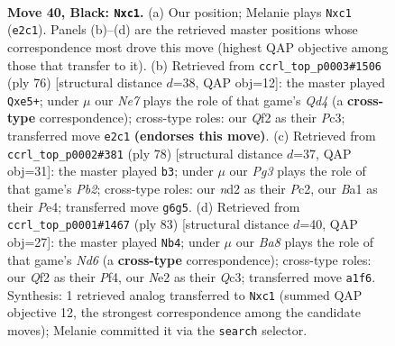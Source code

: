 \documentclass[11pt]{article}
\begin{document}
\clearpage

\begin{figure}[p]\centering
\begin{subfigure}{0.46\textwidth}\centering
\resizebox{\linewidth}{!}{%
\newchessgame
\chessboard[
  setfen={6k1/1p3p2/6p1/p7/7p/7P/P2NnqP1/b1Q4K b - - 0 40},
  showmover=false,
  pgfstyle=straightmove, color=movearrow, markmove={e2-c1}
]}
\caption{}
\end{subfigure}\hfill
\begin{subfigure}{0.46\textwidth}\centering
\resizebox{\linewidth}{!}{%
\newchessgame
\chessboard[
  setfen={8/1p6/p3k1p1/4q3/3Q1p1P/2P5/1P3KP1/8 w - - 12 39},
  showmover=false,
  pgfstyle=straightmove, color=movearrow, markmove={d4-e5}
]}
\caption{}
\end{subfigure}
\\[4pt]
\begin{subfigure}{0.46\textwidth}\centering
\resizebox{\linewidth}{!}{%
\newchessgame
\chessboard[
  setfen={8/1p1q3k/5Q1p/pN4n1/P3P3/8/1PP5/1K6 w - - 1 40},
  showmover=false,
  pgfstyle=straightmove, color=movearrow, markmove={b2-b3}
]}
\caption{}
\end{subfigure}\hfill
\begin{subfigure}{0.46\textwidth}\centering
\resizebox{\linewidth}{!}{%
\newchessgame
\chessboard[
  setfen={5k2/5p2/3p4/p2P4/5p2/2qn3P/P1B2PP1/3Q2K1 b - - 1 42},
  showmover=false,
  pgfstyle=straightmove, color=movearrow, markmove={d3-b4}
]}
\caption{}
\end{subfigure}
\caption{\textbf{Move 40, Black: \texttt{Nxc1}.} (a) Our position; Melanie plays \texttt{Nxc1} (\texttt{e2c1}). Panels (b)--(d) are the retrieved master positions whose correspondence most drove this move (highest QAP objective among those that transfer to it). (b) Retrieved from \texttt{ccrl\_top\_p0003\#1506} (ply 76) [structural distance $d$=38, QAP obj=12]: the master played \texttt{Qxe5+}; under $\mu$ our \emph{Ne7} plays the role of that game's \emph{Qd4} (a \textbf{cross-type} correspondence); cross-type roles: our \emph{Q}f2 as their \emph{P}c3; transferred move \texttt{e2c1} \textbf{(endorses this move)}. (c) Retrieved from \texttt{ccrl\_top\_p0002\#381} (ply 78) [structural distance $d$=37, QAP obj=31]: the master played \texttt{b3}; under $\mu$ our \emph{Pg3} plays the role of that game's \emph{Pb2}; cross-type roles: our \emph{n}d2 as their \emph{P}c2, our \emph{B}a1 as their \emph{P}e4; transferred move \texttt{g6g5}. (d) Retrieved from \texttt{ccrl\_top\_p0001\#1467} (ply 83) [structural distance $d$=40, QAP obj=27]: the master played \texttt{Nb4}; under $\mu$ our \emph{Ba8} plays the role of that game's \emph{Nd6} (a \textbf{cross-type} correspondence); cross-type roles: our \emph{Q}f2 as their \emph{P}f4, our \emph{N}e2 as their \emph{Q}c3; transferred move \texttt{a1f6}. Synthesis: 1 retrieved analog transferred to \texttt{Nxc1} (summed QAP objective 12, the strongest correspondence among the candidate moves); Melanie committed it via the \texttt{search} selector.}
\label{fig:thought-m79}
\end{figure}
\end{document}
